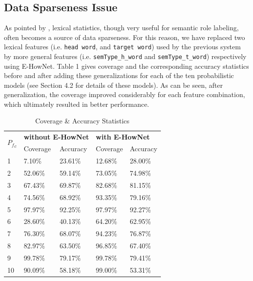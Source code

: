 \documentclass[11pt]{article}
\begin{document}
\subsection*{Data Sparseness Issue}
As pointed by \cite{Gildea:2002}, lexical statistics, though very useful for semantic role labeling, often becomes a source of data sparseness. For this reason, we have replaced two lexical features (i.e. \verb+head word+, and \verb+target word+) used by the previous system by more general features (i.e. \verb+semType_h_word+ and \verb+semType_t_word+) respectively using E-HowNet. Table 1 gives coverage and the corresponding accuracy statistics before and after adding these generalizations for each of the ten probabilistic models (see Section 4.2 for details of these models). As can be seen, after generalization, the coverage improved considerably for each feature combination, which ultimately resulted in better performance.
\begin{table}[!h]
\small
\begin{center}
\begin{tabular}{|l|l|l|l|l|}
\hline
\multirow{2}{*}{\bf${P_f}_c$} & \multicolumn{2}{|l}{{\bf without E-HowNet}} & \multicolumn{2}{|l|}{\bf with E-HowNet} \\ \cline{2-5} 
                  &   Coverage       &      Accuracy     &     Coverage       &     Accuracy      \\ \hline
   1              &    7.10\%       &    23.61\%       &   12.68\%         &        28.00\%   \\ 
   2              &    52.06\%      &     59.14\%      &   73.05\%         &        74.98\% \\ 
   3              &    67.43\%      &     69.87\%      &   82.68\%         &        81.15\%   \\ 
   4              &    74.56\%       &     68.92\%     &   93.35\%          &        79.16\%  \\ 
   5              &    97.97\%      &      92.25\%     &   97.97\%         &         92.27\%  \\ 
   6              &    28.60\%       &     40.13\%      &  64.20\%          &        62.95\%   \\ 
   7              &    76.30\%       &     68.07\%      &  94.23\%          &        76.87\%  \\ 
   8              &    82.97\%       &      63.50\%     &  96.85\%          &        67.40\%  \\ 
   9              &    99.78\%       &      79.17\%     &   99.78\%         &        79.41\%   \\ 
   10             &    90.09\%       &      58.18\%     &   99.00\%         &          53.31\% \\ \hline
\end{tabular}  
\caption{Coverage \& Accuracy Statistics}
\end{center}
\end{table}
\normalsize
\end{document}
